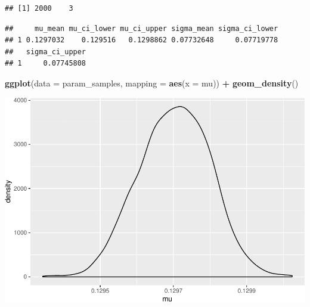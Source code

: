 \documentclass[]{article}
\newenvironment{Shaded}{\begin{snugshade}}{\end{snugshade}}
\newcommand{\KeywordTok}[1]{\textcolor[rgb]{0.13,0.29,0.53}{\textbf{#1}}}
\newcommand{\DataTypeTok}[1]{\textcolor[rgb]{0.13,0.29,0.53}{#1}}
\newcommand{\FloatTok}[1]{\textcolor[rgb]{0.00,0.00,0.81}{#1}}
\newcommand{\StringTok}[1]{\textcolor[rgb]{0.31,0.60,0.02}{#1}}
\newcommand{\OperatorTok}[1]{\textcolor[rgb]{0.81,0.36,0.00}{\textbf{#1}}}
\newcommand{\NormalTok}[1]{#1}
\begin{document}
\begin{verbatim}
## [1] 2000    3
\end{verbatim}

\begin{Shaded}
\end{Shaded}

\begin{verbatim}
##     mu_mean mu_ci_lower mu_ci_upper sigma_mean sigma_ci_lower
## 1 0.1297032    0.129516   0.1298862 0.07732648     0.07719778
##   sigma_ci_upper
## 1     0.07745808
\end{verbatim}

\begin{Shaded}
\begin{Highlighting}[]
\KeywordTok{ggplot}\NormalTok{(}\DataTypeTok{data =}\NormalTok{ param_samples, }\DataTypeTok{mapping =} \KeywordTok{aes}\NormalTok{(}\DataTypeTok{x =}\NormalTok{ mu)) }\OperatorTok{+}
\StringTok{  }\KeywordTok{geom_density}\NormalTok{()}
\end{Highlighting}
\end{Shaded}

\includegraphics{20190225_bayes_MCMC_Metropolis_files/figure-latex/unnamed-chunk-17-1.pdf}
\end{document}
